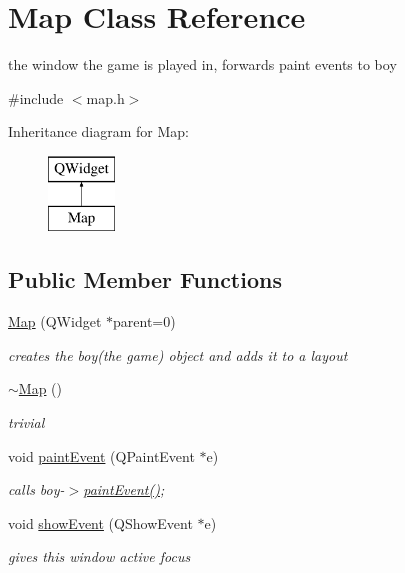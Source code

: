 \hypertarget{class_map}{}\section{Map Class Reference}
\label{class_map}


the window the game is played in, forwards paint events to boy  




{\ttfamily \#include $<$map.\+h$>$}

Inheritance diagram for Map\+:\begin{figure}[H]
\begin{center}
\leavevmode
\includegraphics[height=2.000000cm]{class_map}
\end{center}
\end{figure}
\subsection*{Public Member Functions}
\begin{DoxyCompactItemize}
\item 
\hyperlink{class_map_a7925f9f97d602f8f0c59362131f77927}{Map} (Q\+Widget $\ast$parent=0)
\begin{DoxyCompactList}\small\item\em creates the boy(the game) object and adds it to a layout \end{DoxyCompactList}\item 
\hyperlink{class_map_aa403fbe09394ccf39747588f5168e3b2}{$\sim$\+Map} ()
\begin{DoxyCompactList}\small\item\em trivial \end{DoxyCompactList}\item 
void \hyperlink{class_map_ad2da0fb69784a061fc91d6e7defe39a2}{paint\+Event} (Q\+Paint\+Event $\ast$e)
\begin{DoxyCompactList}\small\item\em calls boy-\/$>$\hyperlink{class_map_ad2da0fb69784a061fc91d6e7defe39a2}{paint\+Event()}; \end{DoxyCompactList}\item 
void \hyperlink{class_map_af9d2bb59a45edbbe78b3a929781dff52}{show\+Event} (Q\+Show\+Event $\ast$e)
\begin{DoxyCompactList}\small\item\em gives this window active focus \end{DoxyCompactList}\end{DoxyCompactItemize}


